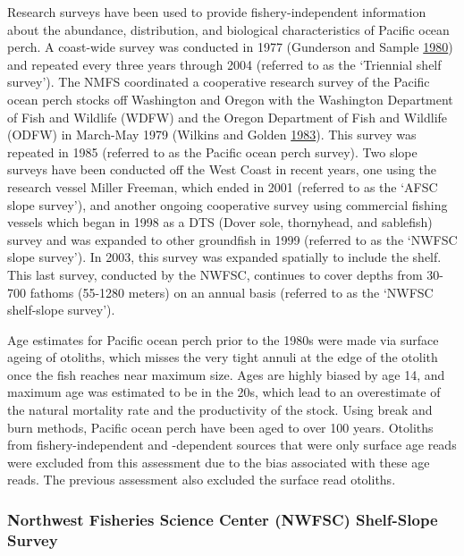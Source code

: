 \documentclass[12pt,]{article}
\begin{document}
Research surveys have been used to provide fishery-independent
information about the abundance, distribution, and biological
characteristics of Pacific ocean perch. A coast-wide survey was
conducted in 1977 (Gunderson and Sample
\protect\hyperlink{ref-gunderson_distribution_1980}{1980}) and repeated
every three years through 2004 (referred to as the `Triennial shelf
survey'). The NMFS coordinated a cooperative research survey of the
Pacific ocean perch stocks off Washington and Oregon with the Washington
Department of Fish and Wildlife (WDFW) and the Oregon Department of Fish
and Wildlife (ODFW) in March-May 1979 (Wilkins and Golden
\protect\hyperlink{ref-wilkins_condition_1983}{1983}). This survey was
repeated in 1985 (referred to as the Pacific ocean perch survey). Two
slope surveys have been conducted off the West Coast in recent years,
one using the research vessel Miller Freeman, which ended in 2001
(referred to as the `AFSC slope survey'), and another ongoing
cooperative survey using commercial fishing vessels which began in 1998
as a DTS (Dover sole, thornyhead, and sablefish) survey and was expanded
to other groundfish in 1999 (referred to as the `NWFSC slope survey').
In 2003, this survey was expanded spatially to include the shelf. This
last survey, conducted by the NWFSC, continues to cover depths from
30-700 fathoms (55-1280 meters) on an annual basis (referred to as the
`NWFSC shelf-slope survey').

Age estimates for Pacific ocean perch prior to the 1980s were made via
surface ageing of otoliths, which misses the very tight annuli at the
edge of the otolith once the fish reaches near maximum size. Ages are
highly biased by age 14, and maximum age was estimated to be in the 20s,
which lead to an overestimate of the natural mortality rate and the
productivity of the stock. Using break and burn methods, Pacific ocean
perch have been aged to over 100 years. Otoliths from
fishery-independent and -dependent sources that were only surface age
reads were excluded from this assessment due to the bias associated with
these age reads. The previous assessment also excluded the surface read
otoliths.

\subsubsection{Northwest Fisheries Science Center (NWFSC) Shelf-Slope
Survey}\label{northwest-fisheries-science-center-nwfsc-shelf-slope-survey}
\end{document}
